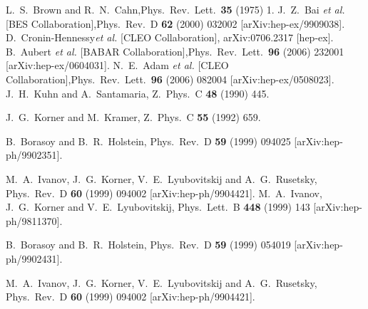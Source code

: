 \documentclass{article}
\begin{document}
\begin{thebibliography}{99}
 L.~S.~Brown and R.~N.~Cahn,Phys.\ Rev.\ Lett.\  {\bf 35} (1975) 1.%
 J.~Z.~Bai {\it et al.}  [BES Collaboration],Phys.\ Rev.\  D {\bf 62} (2000) 032002 [arXiv:hep-ex/9909038].%
 D.~Cronin-Hennessy{\it et al.} [CLEO Collaboration], arXiv:0706.2317 [hep-ex].%
 B.~Aubert {\it et al.}  [BABAR Collaboration],Phys.\ Rev.\ Lett.\  {\bf 96} (2006) 232001 [arXiv:hep-ex/0604031].%
 N.~E.~Adam {\it et al.}  [CLEO Collaboration],Phys.\ Rev.\ Lett.\  {\bf 96} (2006) 082004 [arXiv:hep-ex/0508023].%
 J.~H.~Kuhn and A.~Santamaria,
Z.\ Phys.\  C {\bf 48} (1990) 445.

J.~G.~Korner and M.~Kramer,
Z.\ Phys.\  C {\bf 55} (1992) 659.

B.~Borasoy and B.~R.~Holstein,
Phys.\ Rev.\  D {\bf 59} (1999) 094025 [arXiv:hep-ph/9902351].

M.~A.~Ivanov, J.~G.~Korner, V.~E.~Lyubovitskij and A.~G.~Rusetsky,
Phys.\ Rev.\  D {\bf 60} (1999) 094002
[arXiv:hep-ph/9904421].
M.~A.~Ivanov, J.~G.~Korner and V.~E.~Lyubovitskij,
Phys.\ Lett.\  B {\bf 448} (1999) 143 [arXiv:hep-ph/9811370].

B.~Borasoy and B.~R.~Holstein,
Phys.\ Rev.\  D {\bf 59} (1999) 054019 [arXiv:hep-ph/9902431].

M.~A.~Ivanov, J.~G.~Korner, V.~E.~Lyubovitskij and A.~G.~Rusetsky,
Phys.\ Rev.\  D {\bf 60} (1999) 094002
[arXiv:hep-ph/9904421].

\end{thebibliography}
\end{document}
